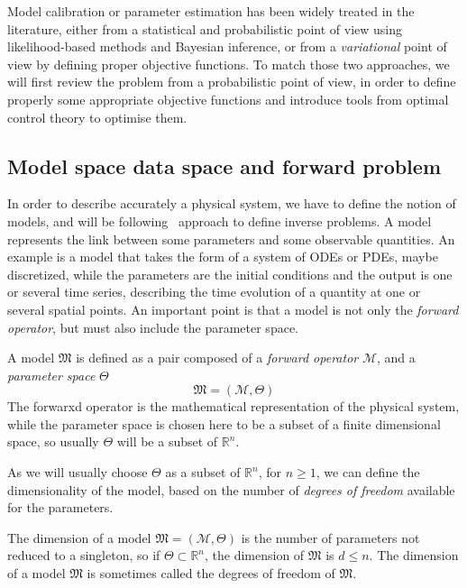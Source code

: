 \documentclass[../../Main_ManuscritThese.tex]{subfiles}
\begin{document}
Model calibration or parameter estimation has been widely treated in
the literature, either from a statistical and probabilistic point of
view using likelihood-based methods and Bayesian inference, or from a
\emph{variational} point of view by defining proper objective
functions. To match those two approaches, we will first review the
problem from a probabilistic point of view, in order to define
properly some appropriate objective functions and introduce tools from
optimal control theory to optimise them.

 \subsection{Model space data space and forward problem}
\label{sec:model_space_data_space}
In order to describe accurately a physical system, we have to define
the notion of models, and will be
following~\cite{tarantola_inverse_2005} approach to define inverse
problems.  A model represents the link between some parameters and
some observable quantities. An example is a model that takes the form
of a system of ODEs or PDEs, maybe discretized, while the parameters
are the initial conditions and the output is one or several time
series, describing the time evolution of a quantity at one or several
spatial points. An important point is that a model is not only the
\emph{forward operator}, but must also include the parameter space.


 \begin{definition}[Model]
   \label{def:model}
  A model $\mathfrak{M}$ is defined as a pair composed of a \emph{forward operator} $\mathcal{M}$, and a \emph{parameter space} $\Theta$
  \begin{equation}
    \mathfrak{M} = (\mathcal{M}, \Theta)
  \end{equation}
  The forwarxd operator is the mathematical representation of the
  physical system, while the parameter space is chosen here to be a
  subset of a finite dimensional space, so usually $\Theta$ will be a
  subset of $\mathbb{R}^n$.
\end{definition}
As we will usually choose $\Theta$ as a subset of $\mathbb{R}^n$, for
$n\geq 1$, we can define the dimensionality of the model, based on the
number of \emph{degrees of freedom} available for the parameters.


\begin{remark}
  \label{rmk:model_dimension}
  The dimension of a model $\mathfrak{M}=(\mathcal{M},\Theta)$ is the number of parameters not reduced to a singleton, so if $\Theta \subset \mathbb{R}^n$, the dimension of $\mathfrak{M}$ is $d \leq n$. The dimension of a model $\mathfrak{M}$ is sometimes called the degrees of freedom of $\mathfrak{M}$.
  \end{remark}
\end{document}

